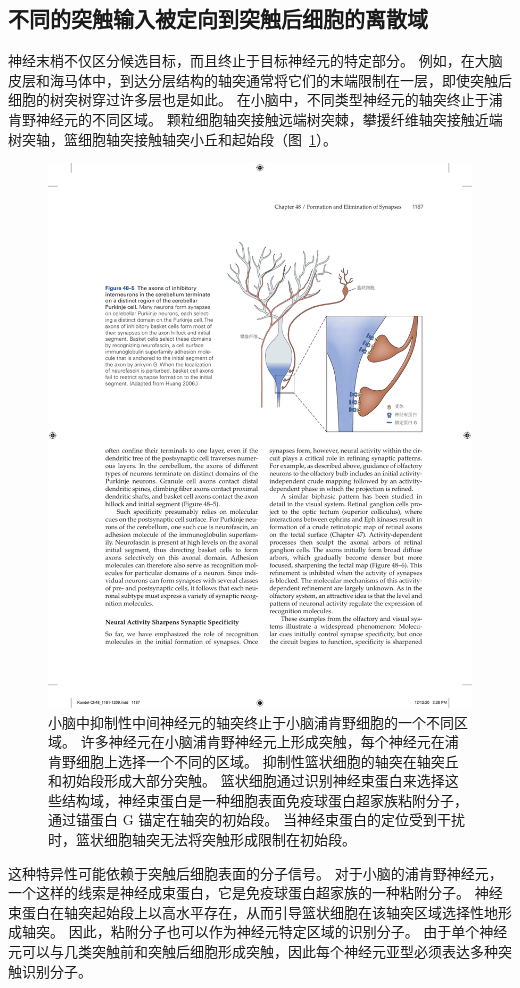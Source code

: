 \subsection{不同的突触输入被定向到突触后细胞的离散域}


神经末梢不仅区分候选目标，而且终止于目标神经元的特定部分。
例如，在大脑皮层和海马体中，到达分层结构的轴突通常将它们的末端限制在一层，即使突触后细胞的树突树穿过许多层也是如此。
在小脑中，不同类型神经元的轴突终止于浦肯野神经元的不同区域。
颗粒细胞轴突接触远端树突棘，攀援纤维轴突接触近端树突轴，篮细胞轴突接触轴突小丘和起始段（图~\ref{fig:48_5}）。


\begin{figure}[htbp]
	\centering
	\includegraphics[width=0.7\linewidth]{chap48/fig_48_5}
	\caption{小脑中抑制性中间神经元的轴突终止于小脑浦肯野细胞的一个不同区域。
		许多神经元在小脑浦肯野神经元上形成突触，每个神经元在浦肯野细胞上选择一个不同的区域。
		抑制性篮状细胞的轴突在轴突丘和初始段形成大部分突触。
		篮状细胞通过识别神经束蛋白来选择这些结构域，神经束蛋白是一种细胞表面免疫球蛋白超家族粘附分子，通过锚蛋白 G 锚定在轴突的初始段。
		当神经束蛋白的定位受到干扰时，篮状细胞轴突无法将突触形成限制在初始段\cite{huang2006subcellular}。}
	\label{fig:48_5}
\end{figure}


这种特异性可能依赖于突触后细胞表面的分子信号。
对于小脑的浦肯野神经元，一个这样的线索是神经成束蛋白，它是免疫球蛋白超家族的一种粘附分子。
神经束蛋白在轴突起始段上以高水平存在，从而引导篮状细胞在该轴突区域选择性地形成轴突。
因此，粘附分子也可以作为神经元特定区域的识别分子。
由于单个神经元可以与几类突触前和突触后细胞形成突触，因此每个神经元亚型必须表达多种突触识别分子。



